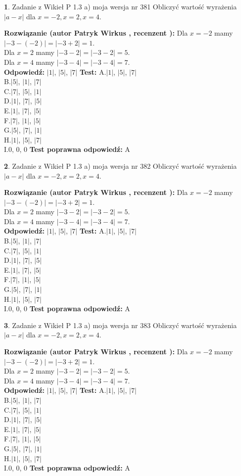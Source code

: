 \documentclass[12pt, a4paper]{article}
\theoremstyle{definition} %
\newtheorem{zad}{}
\newcommand{\zadStart}[1]{\begin{zad}#1\newline}
\newcommand{\zadStop}{\end{zad}}
\newcommand{\rozwStart}[2]{\noindent \textbf{Rozwiązanie (autor #1 , recenzent #2): }\newline}
\newcommand{\rozwStop}{\newline}
\newcommand{\odpStart}{\noindent \textbf{Odpowiedź:}\newline}
\newcommand{\odpStop}{\newline}
\newcommand{\testStart}{\noindent \textbf{Test:}\newline}
\newcommand{\testStop}{\newline}
\newcommand{\kluczStart}{\noindent \textbf{Test poprawna odpowiedź:}\newline}
\newcommand{\kluczStop}{\newline}
\begin{document}
\zadStart{Zadanie z Wikieł P 1.3 a) moja wersja nr 381}
Obliczyć wartość wyrażenia $|a - x|$ dla $x=-2,x=2,x=4$.
\zadStop
\rozwStart{Patryk Wirkus}{}
Dla $x = -2$ mamy $|-3 - (-2)| = |-3 + 2| = 1$.\\
Dla $x = 2$ mamy $|-3 - 2| = |-3 - 2| = 5$.\\
Dla $x = 4$ mamy $|-3 - 4| = |-3 - 4| = 7$.\\
\rozwStop
\odpStart
$|1|$, $|5|$, $|7|$
\odpStop
\testStart
A.$|1|$, $|5|$, $|7|$\\
B.$|5|$, $|1|$, $|7|$\\
C.$|7|$, $|5|$, $|1|$\\
D.$|1|$, $|7|$, $|5|$\\
E.$|1|$, $|7|$, $|5|$\\
F.$|7|$, $|1|$, $|5|$\\
G.$|5|$, $|7|$, $|1|$\\
H.$|1|$, $|5|$, $|7|$\\
I.$0$, $0$, $0$
\testStop
\kluczStart
A
\kluczStop



\zadStart{Zadanie z Wikieł P 1.3 a) moja wersja nr 382}
Obliczyć wartość wyrażenia $|a - x|$ dla $x=-2,x=2,x=4$.
\zadStop
\rozwStart{Patryk Wirkus}{}
Dla $x = -2$ mamy $|-3 - (-2)| = |-3 + 2| = 1$.\\
Dla $x = 2$ mamy $|-3 - 2| = |-3 - 2| = 5$.\\
Dla $x = 4$ mamy $|-3 - 4| = |-3 - 4| = 7$.\\
\rozwStop
\odpStart
$|1|$, $|5|$, $|7|$
\odpStop
\testStart
A.$|1|$, $|5|$, $|7|$\\
B.$|5|$, $|1|$, $|7|$\\
C.$|7|$, $|5|$, $|1|$\\
D.$|1|$, $|7|$, $|5|$\\
E.$|1|$, $|7|$, $|5|$\\
F.$|7|$, $|1|$, $|5|$\\
G.$|5|$, $|7|$, $|1|$\\
H.$|1|$, $|5|$, $|7|$\\
I.$0$, $0$, $0$
\testStop
\kluczStart
A
\kluczStop



\zadStart{Zadanie z Wikieł P 1.3 a) moja wersja nr 383}
Obliczyć wartość wyrażenia $|a - x|$ dla $x=-2,x=2,x=4$.
\zadStop
\rozwStart{Patryk Wirkus}{}
Dla $x = -2$ mamy $|-3 - (-2)| = |-3 + 2| = 1$.\\
Dla $x = 2$ mamy $|-3 - 2| = |-3 - 2| = 5$.\\
Dla $x = 4$ mamy $|-3 - 4| = |-3 - 4| = 7$.\\
\rozwStop
\odpStart
$|1|$, $|5|$, $|7|$
\odpStop
\testStart
A.$|1|$, $|5|$, $|7|$\\
B.$|5|$, $|1|$, $|7|$\\
C.$|7|$, $|5|$, $|1|$\\
D.$|1|$, $|7|$, $|5|$\\
E.$|1|$, $|7|$, $|5|$\\
F.$|7|$, $|1|$, $|5|$\\
G.$|5|$, $|7|$, $|1|$\\
H.$|1|$, $|5|$, $|7|$\\
I.$0$, $0$, $0$
\testStop
\kluczStart
A
\kluczStop
\end{document}
